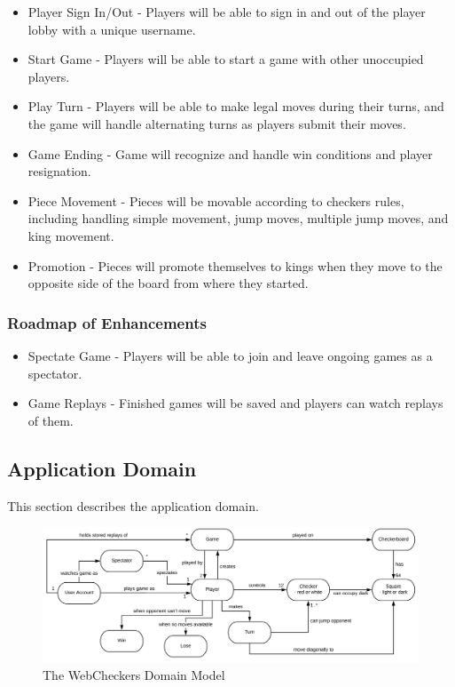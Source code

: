 \documentclass[]{article}
\providecommand{\tightlist}{%
  \setlength{\itemsep}{0pt}\setlength{\parskip}{0pt}}
\begin{document}
\begin{itemize}
\tightlist
\item
  Player Sign In/Out - Players will be able to sign in and out of the
  player lobby with a unique username.
\item
  Start Game - Players will be able to start a game with other
  unoccupied players.
\item
  Play Turn - Players will be able to make legal moves during their
  turns, and the game will handle alternating turns as players submit
  their moves.
\item
  Game Ending - Game will recognize and handle win conditions and player
  resignation.
\item
  Piece Movement - Pieces will be movable according to checkers rules,
  including handling simple movement, jump moves, multiple jump moves,
  and king movement.
\item
  Promotion - Pieces will promote themselves to kings when they move to
  the opposite side of the board from where they started.
\end{itemize}

\hypertarget{roadmap-of-enhancements}{%
\subsubsection{Roadmap of Enhancements}\label{roadmap-of-enhancements}}

\begin{itemize}
\tightlist
\item
  Spectate Game - Players will be able to join and leave ongoing games
  as a spectator.
\item
  Game Replays - Finished games will be saved and players can watch
  replays of them.
\end{itemize}

\hypertarget{application-domain}{%
\subsection{Application Domain}\label{application-domain}}

This section describes the application domain.

\begin{figure}
\centering
\includegraphics{./tex2pdf.1500/4f3b5fcbfccfe089ecaf165dc9c6e50bfa14e36f.png}
\caption{The WebCheckers Domain Model}
\end{figure}
\end{document}
